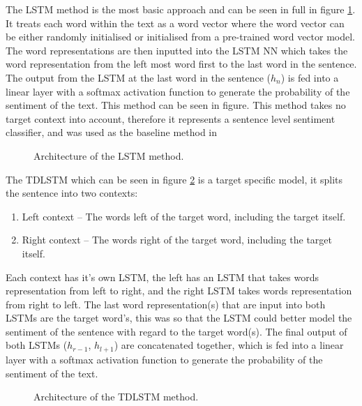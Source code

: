 The LSTM method is the most basic approach and can be seen in full in figure \ref{fig:repro_lstm_method}. It treats each word within the text as a word vector where the word vector can be either randomly initialised or initialised from a pre-trained word vector model. The word representations are then inputted into the LSTM NN which takes the word representation from the left most word first to the last word in the sentence. The output from the LSTM at the last word in the sentence ($h_n$) is fed into a linear layer with a softmax activation function to generate the probability of the sentiment of the text. This method can be seen in figure. This method takes no target context into account, therefore it represents a sentence level sentiment classifier, and was used as the baseline method in \citet{tang-etal-2016-effective}\\
\begin{figure}[!ht]
    \centering
    
    \caption{Architecture of the LSTM method.}
    \label{fig:repro_lstm_method}
\end{figure}

The TDLSTM which can be seen in figure \ref{fig:repro_tdlstm_method} is a target specific model, it splits the sentence into two contexts:
\begin{enumerate}
    \item Left context -- The words left of the target word, including the target itself.
    \item Right context -- The words right of the target word, including the target itself.
\end{enumerate}
Each context has it's own LSTM, the left has an LSTM that takes words representation from left to right, and the right LSTM takes words representation from right to left. The last word representation(s) that are input into both LSTMs are the target word's, this was so that the LSTM could better model the sentiment of the sentence with regard to the target word(s). The final output of both LSTMs ($h_{r-1}$, $h_{l+1}$) are concatenated together, which is fed into a linear layer with a softmax activation function to generate the probability of the sentiment of the text.

\begin{figure}[!ht]
    \centering
    
    \caption{Architecture of the TDLSTM method.}
    \label{fig:repro_tdlstm_method}
\end{figure}

